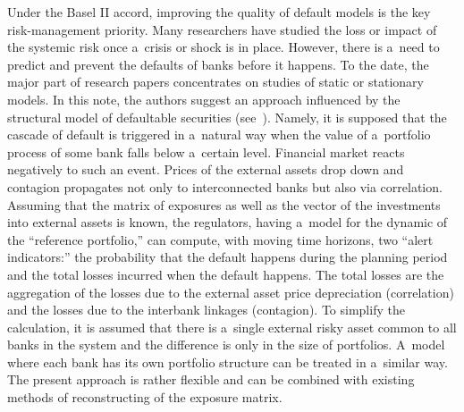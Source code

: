 \begin{multicols}{2}
Under the Basel II accord, improving the quality of default models  is the key 
risk-management priority. Many researchers have studied the loss or impact of 
the systemic risk once a~crisis or shock is in place. However, there is a~need 
to predict and prevent the defaults of banks before it happens. To the date, the 
major part of research papers concentrates on studies of static or stationary 
models. In this note, the authors suggest an approach influenced by the structural model 
of defaultable securities (see~\cite{Biel-Rut}). Namely, it is supposed that the 
cascade of default is triggered in a~natural way when the value of a~portfolio 
process of some bank falls below  a~certain level. Financial market  reacts 
negatively to such an event. Prices of the external assets drop down and 
contagion propagates not only to interconnected banks but also via correlation. 
Assuming that the matrix of exposures as well as the vector of the investments 
into external assets is known, the regulators, having a~model for the dynamic of 
the ``reference portfolio,''  can compute, with moving time horizons, two 
``alert indicators:''  the probability that the default  happens during 
the planning period and the total losses incurred when the default happens. The 
total losses are the aggregation of the losses due to the external asset price 
depreciation (correlation)  and the losses due to the interbank linkages 
(contagion). To simplify the calculation, it is assumed that there is a~single 
external risky asset common to all banks in the system and the difference is 
only in the size of portfolios. A~model where each bank has its own portfolio 
structure  can be treated in a~similar way.
The present approach is rather flexible and can be combined with existing methods of 
reconstructing of the exposure matrix.




\end{multicols}
